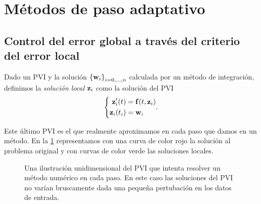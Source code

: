 \section{Métodos de paso adaptativo}

\subsection{Control del error global a través del criterio del error local}

\begin{definition}
    Dado un PVI y la solución $\qty{\vb{w}{}_i}_{i = 0,\ldots,n}$
    calculada por un método de integración,
    definimos la \emph{solución local} $\vb{z}{}_i$
    como la solución del PVI
    \begin{equation*}
        \left\{
        \begin{aligned}
            \vb{z}{}_i'(t) &= \vb{f}{}(t, \vb{z}{}_i) \\
            \vb{z}{}_i(t_i) &= \vb{w}{}_i
        \end{aligned}.
        \right.
    \end{equation*}
\end{definition}

Este último PVI es el que realmente aproximamos
en cada paso que damos en un método.
En la \cref{fig:local-sol} representamos
con una curva de color rojo la solución al problema original
y con curvas de color verde las soluciones locales.

\begin{figure}[h]
    \centering
    \caption{Una ilustración unidimensional del PVI que intenta resolver
    un método numérico en cada paso.
    En este caso las soluciones del PVI no varían bruscamente
    dada una pequeña pertubación en los datos de entrada.}
    \label{fig:local-sol}
\end{figure}

